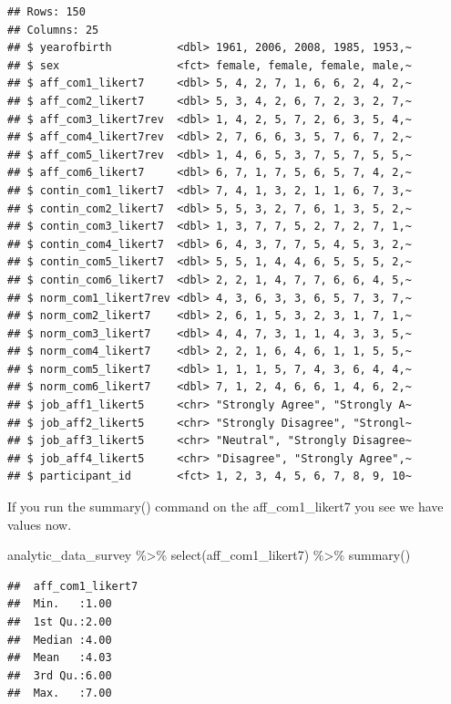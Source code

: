 \documentclass[
]{krantz}
\makeatletter
\newenvironment{Shaded}{\begin{snugshade}}{\end{snugshade}}
\newcommand{\FunctionTok}[1]{\textcolor[rgb]{0,0,0}{#1}}
\newcommand{\NormalTok}[1]{#1}
\newcommand{\SpecialCharTok}[1]{\textcolor[rgb]{0,0,0}{#1}}
\newenvironment{kframe}{%
\medskip{}
\setlength{\fboxsep}{.8em}
 \def\at@end@of@kframe{}%
 \ifinner\ifhmode%
  \def\at@end@of@kframe{\end{minipage}}%
  \begin{minipage}{\columnwidth}%
 \fi\fi%
 \def\FrameCommand##1{\hskip\@totalleftmargin \hskip-\fboxsep
 \colorbox{shadecolor}{##1}\hskip-\fboxsep
     \hskip-\linewidth \hskip-\@totalleftmargin \hskip\columnwidth}%
 \MakeFramed {\advance\hsize-\width
   \@totalleftmargin\z@ \linewidth\hsize
   \@setminipage}}%
 {\par\unskip\endMakeFramed%
 \at@end@of@kframe}
\renewenvironment{Shaded}{\begin{kframe}}{\end{kframe}}
\makeatother
\begin{document}
\begin{verbatim}
## Rows: 150
## Columns: 25
## $ yearofbirth          <dbl> 1961, 2006, 2008, 1985, 1953,~
## $ sex                  <fct> female, female, female, male,~
## $ aff_com1_likert7     <dbl> 5, 4, 2, 7, 1, 6, 6, 2, 4, 2,~
## $ aff_com2_likert7     <dbl> 5, 3, 4, 2, 6, 7, 2, 3, 2, 7,~
## $ aff_com3_likert7rev  <dbl> 1, 4, 2, 5, 7, 2, 6, 3, 5, 4,~
## $ aff_com4_likert7rev  <dbl> 2, 7, 6, 6, 3, 5, 7, 6, 7, 2,~
## $ aff_com5_likert7rev  <dbl> 1, 4, 6, 5, 3, 7, 5, 7, 5, 5,~
## $ aff_com6_likert7     <dbl> 6, 7, 1, 7, 5, 6, 5, 7, 4, 2,~
## $ contin_com1_likert7  <dbl> 7, 4, 1, 3, 2, 1, 1, 6, 7, 3,~
## $ contin_com2_likert7  <dbl> 5, 5, 3, 2, 7, 6, 1, 3, 5, 2,~
## $ contin_com3_likert7  <dbl> 1, 3, 7, 7, 5, 2, 7, 2, 7, 1,~
## $ contin_com4_likert7  <dbl> 6, 4, 3, 7, 7, 5, 4, 5, 3, 2,~
## $ contin_com5_likert7  <dbl> 5, 5, 1, 4, 4, 6, 5, 5, 5, 2,~
## $ contin_com6_likert7  <dbl> 2, 2, 1, 4, 7, 7, 6, 6, 4, 5,~
## $ norm_com1_likert7rev <dbl> 4, 3, 6, 3, 3, 6, 5, 7, 3, 7,~
## $ norm_com2_likert7    <dbl> 2, 6, 1, 5, 3, 2, 3, 1, 7, 1,~
## $ norm_com3_likert7    <dbl> 4, 4, 7, 3, 1, 1, 4, 3, 3, 5,~
## $ norm_com4_likert7    <dbl> 2, 2, 1, 6, 4, 6, 1, 1, 5, 5,~
## $ norm_com5_likert7    <dbl> 1, 1, 1, 5, 7, 4, 3, 6, 4, 4,~
## $ norm_com6_likert7    <dbl> 7, 1, 2, 4, 6, 6, 1, 4, 6, 2,~
## $ job_aff1_likert5     <chr> "Strongly Agree", "Strongly A~
## $ job_aff2_likert5     <chr> "Strongly Disagree", "Strongl~
## $ job_aff3_likert5     <chr> "Neutral", "Strongly Disagree~
## $ job_aff4_likert5     <chr> "Disagree", "Strongly Agree",~
## $ participant_id       <fct> 1, 2, 3, 4, 5, 6, 7, 8, 9, 10~
\end{verbatim}

If you run the summary() command on the aff\_com1\_likert7 you see we have values now.

\begin{Shaded}
\begin{Highlighting}[]
\NormalTok{analytic\_data\_survey }\SpecialCharTok{\%\textgreater{}\%} 
    \FunctionTok{select}\NormalTok{(aff\_com1\_likert7) }\SpecialCharTok{\%\textgreater{}\%}
    \FunctionTok{summary}\NormalTok{()}
\end{Highlighting}
\end{Shaded}

\begin{verbatim}
##  aff_com1_likert7
##  Min.   :1.00    
##  1st Qu.:2.00    
##  Median :4.00    
##  Mean   :4.03    
##  3rd Qu.:6.00    
##  Max.   :7.00
\end{verbatim}
\end{document}

